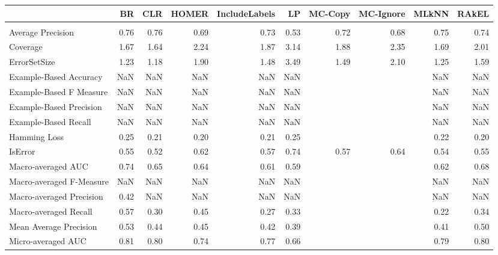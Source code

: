 \begin{tabular}{l|rrrrrrrrr}

  & BR & CLR & HOMER & IncludeLabels & LP & MC-Copy & MC-Ignore & MLkNN & RAkEL \\

\hline \\

Average Precision & 0.76 & 0.76 & 0.69 & 0.73 & 0.53 & 0.72 & 0.68 & 0.75 & 0.74 \\

Coverage & 1.67 & 1.64 & 2.24 & 1.87 & 3.14 & 1.88 & 2.35 & 1.69 & 2.01 \\

ErrorSetSize & 1.23 & 1.18 & 1.90 & 1.48 & 3.49 & 1.49 & 2.10 & 1.25 & 1.59 \\

Example-Based Accuracy & NaN & NaN & NaN & NaN & NaN &  &  & NaN & NaN \\

Example-Based F Measure & NaN & NaN & NaN & NaN & NaN &  &  & NaN & NaN \\

Example-Based Precision & NaN & NaN & NaN & NaN & NaN &  &  & NaN & NaN \\

Example-Based Recall & NaN & NaN & NaN & NaN & NaN &  &  & NaN & NaN \\

Hamming Loss & 0.25 & 0.21 & 0.20 & 0.21 & 0.25 &  &  & 0.22 & 0.20 \\

IsError & 0.55 & 0.52 & 0.62 & 0.57 & 0.74 & 0.57 & 0.64 & 0.54 & 0.55 \\

Macro-averaged AUC & 0.74 & 0.65 & 0.64 & 0.61 & 0.59 &  &  & 0.62 & 0.68 \\

Macro-averaged F-Measure & NaN & NaN & NaN & NaN & NaN &  &  & NaN & NaN \\

Macro-averaged Precision & 0.42 & NaN & NaN & NaN & NaN &  &  & NaN & NaN \\

Macro-averaged Recall & 0.57 & 0.30 & 0.45 & 0.27 & 0.33 &  &  & 0.22 & 0.34 \\

Mean Average Precision & 0.53 & 0.44 & 0.45 & 0.42 & 0.39 &  &  & 0.41 & 0.50 \\

Micro-averaged AUC & 0.81 & 0.80 & 0.74 & 0.77 & 0.66 &  &  & 0.79 & 0.80 \\


\end{tabular}
